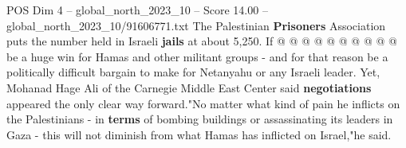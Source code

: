 \begin{textsample}{POS Dim 4 – global\_north\_2023\_10 – Score 14.00 – global\_north\_2023\_10/91606771.txt}
The Palestinian \textbf{Prisoners} Association puts the number held in Israeli \textbf{jails} at about 5,250.
If @ @ @ @ @ @ @ @ @ @ be a huge win for Hamas and other militant groups - and for that reason be a politically difficult bargain to make for Netanyahu or any Israeli leader.
Yet, Mohanad Hage Ali of the Carnegie Middle East Center said \textbf{negotiations} appeared the only clear way forward."No matter what kind of pain he inflicts on the Palestinians - in \textbf{terms} of bombing buildings or assassinating its leaders in Gaza - this will not diminish from what Hamas has inflicted on Israel,"he said.

\end{textsample}
